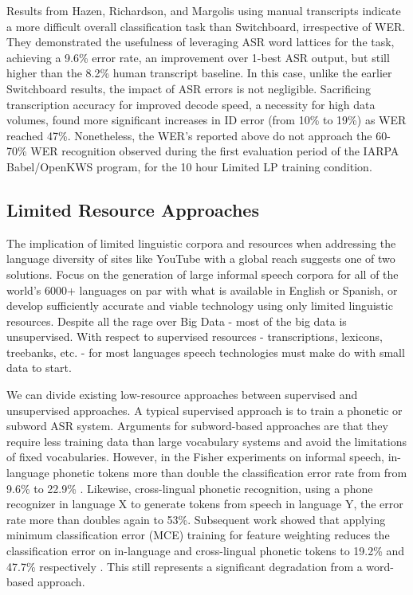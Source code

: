 Results from Hazen, Richardson, and Margolis \cite{hazen2007} using manual transcripts indicate a more difficult overall classification task than Switchboard, irrespective of WER.  They demonstrated the usefulness of leveraging ASR word lattices for the task, achieving a 9.6\% error rate, an improvement over 1-best ASR output, but still higher than the 8.2\% human transcript baseline.  In this case, unlike the earlier Switchboard results, the impact of ASR errors is not negligible.  Sacrificing transcription accuracy for improved decode speed, a necessity for high data volumes, \cite{wintrode2009} found more significant increases in ID error (from 10\% to 19\%) as WER reached 47\%.  Nonetheless, the WER's reported above do not approach the 60-70\% WER recognition observed during the first evaluation period of the IARPA Babel/OpenKWS program, for the 10 hour Limited LP training condition\cite{chen2013}.

\subsection{Limited Resource Approaches}
The implication of limited linguistic corpora and resources when addressing the language diversity of sites like YouTube with a global reach suggests one of two solutions.  Focus on the generation of large informal speech corpora for all of the world's 6000+ languages on par with what is available in English or Spanish, or develop sufficiently accurate and viable technology using only limited linguistic resources.  Despite all the rage over Big Data - most of the big data  is unsupervised.  With respect to supervised resources - transcriptions, lexicons, treebanks, etc. - for most languages speech technologies must make do with small data to start.

We can divide existing low-resource approaches between supervised and unsupervised approaches.  A typical supervised approach is to train a phonetic or subword ASR system.  Arguments for subword-based approaches are that they require less training data than large vocabulary systems and avoid the limitations of fixed vocabularies.  However, in the Fisher experiments on informal speech, in-language phonetic tokens more than double the classification error rate from from 9.6\% to 22.9\% \cite{hazen2007}.  Likewise, cross-lingual phonetic recognition, using a phone recognizer in language X to generate tokens from speech in language Y, the error rate more than doubles again to 53\%.  Subsequent work showed that applying minimum classification error (MCE) training for feature weighting reduces the classification error on in-language and cross-lingual phonetic tokens to  19.2\% and 47.7\% respectively \cite{hazen2008}.  This still represents a significant degradation from a word-based approach.

